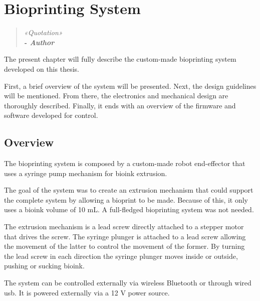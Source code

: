 \chapter{Bioprinting System}
\label{cha:bioprinting_system}

\begin{quotation}
\begin{flushright}
\itshape
«Quotation»\\
\textbf{- Author}
\end{flushright}
\end{quotation}

The present chapter will fully describe the custom-made bioprinting system developed on this thesis.

First, a brief overview of the system will be presented. Next, the design guidelines will be mentioned. From there, the electronics and mechanical design are thoroughly described. Finally, it ends with an overview of the firmware and software developed for control. 


\section{Overview}
\label{sec:bioprinting_system_overview}

The bioprinting system is composed by a custom-made robot end-effector that uses a syringe pump mechanism for bioink extrusion.

The goal of the system was to create an extrusion mechanism that could support the complete system by allowing a bioprint to be made. Because of this, it only uses a bioink volume of 10 \si{\milli\liter}. A full-fledged bioprinting system was not needed.

The extrusion mechanism is a lead screw directly attached to a stepper motor that drives the screw. The syringe plunger is attached to a lead screw allowing the movement of the latter to control the movement of the former. By turning the lead screw in each direction the syringe plunger moves inside or outside, pushing or sucking bioink.

The system can be controlled externally via wireless Bluetooth or through wired \gls{usb}. It is powered externally via a 12 \si{\volt} power source.

